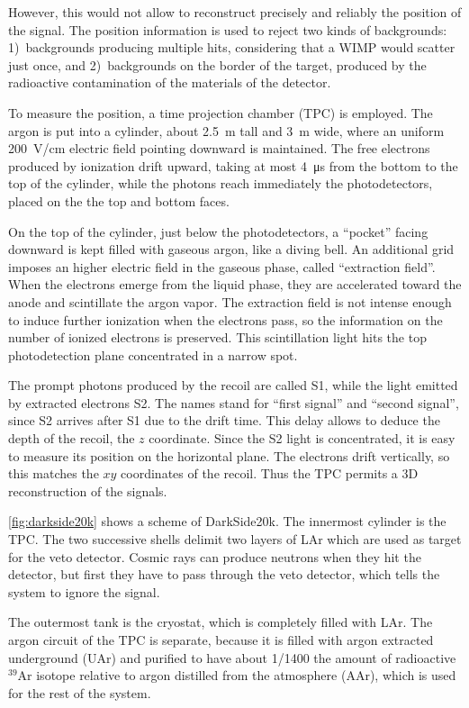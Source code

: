 However, this would not allow to reconstruct precisely and reliably the
position of the signal. The position information is used to reject two kinds of
backgrounds: 1)~backgrounds producing multiple hits, considering that a WIMP
would scatter just once, and 2)~backgrounds on the border of the target,
produced by the radioactive contamination of the materials of the detector.

To measure the position, a time projection chamber (TPC) is employed. The argon
is put into a cylinder, about \SI{2.5}{m} tall and \SI{3}{m} wide, where an
uniform \SI{200}{V/cm} electric field pointing downward is maintained. The free
electrons produced by ionization drift upward, taking at most \SI{4}{\micro s}
from the bottom to the top of the cylinder, while the photons reach immediately
the photodetectors, placed on the the top and bottom faces.

On the top of the cylinder, just below the photodetectors, a ``pocket'' facing
downward is kept filled with gaseous argon, like a diving bell. An additional
grid imposes an higher electric field in the gaseous phase, called ``extraction
field''. When the electrons emerge from the liquid phase, they are accelerated
toward the anode and scintillate the argon vapor. The extraction field is not
intense enough to induce further ionization when the electrons pass, so the
information on the number of ionized electrons is preserved. This scintillation
light hits the top photodetection plane concentrated in a narrow spot.

The prompt photons produced by the recoil are called S1, while the light
emitted by extracted electrons S2. The names stand for ``first signal'' and
``second signal'', since S2 arrives after S1 due to the drift time. This delay
allows to deduce the depth of the recoil, the $z$ coordinate. Since the S2
light is concentrated, it is easy to measure its position on the horizontal
plane. The electrons drift vertically, so this matches the $xy$ coordinates
of the recoil. Thus the TPC permits a 3D reconstruction of the signals.

\autoref{fig:darkside20k} shows a scheme of DarkSide20k. The innermost cylinder
is the TPC. The two successive shells delimit two layers of LAr which are used
as target for the veto detector. Cosmic rays can produce neutrons when they hit
the detector, but first they have to pass through the veto detector, which
tells the system to ignore the signal.

The outermost tank is the cryostat, which is completely filled with LAr. The
argon circuit of the TPC is separate, because it is filled with argon extracted
underground (UAr) and purified to have about 1/1400 the amount of radioactive
$^{39}$Ar isotope relative to argon distilled from the atmosphere (AAr), which
is used for the rest of the system.

